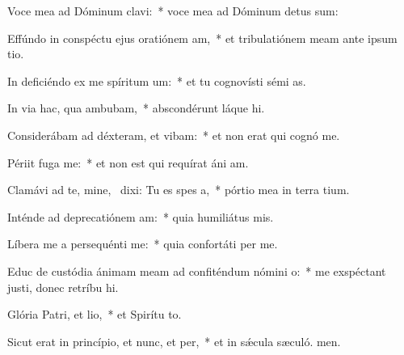 \item Voce mea ad Dóminum clavi:~* voce mea ad Dóminum detus sum:
\item Effúndo in conspéctu ejus oratiónem am,~* et tribulatiónem meam ante ipsum tio.
\item In deficiéndo ex me spíritum um:~* et tu cognovísti sémi as.
\item In via hac, qua ambubam,~* abscondérunt láque hi.
\item Considerábam ad déxteram, et vibam:~* et non erat qui cognó me.
\item Périit fuga  me:~* et non est qui requírat áni am.
\item Clamávi ad te, mine,~\pscross{} dixi: Tu es spes a,~* pórtio mea in terra tium.
\item Inténde ad deprecatiónem am:~* quia humiliátus  mis.
\item Líbera me a persequénti me:~* quia confortáti  per me.
\item Educ de custódia ánimam meam ad confiténdum nómini o:~* me exspéctant justi, donec retríbu hi.
\item Glória Patri, et lio,~* et Spirítu to.
\item Sicut erat in princípio, et nunc, et per,~* et in sǽcula sæculó. men.

